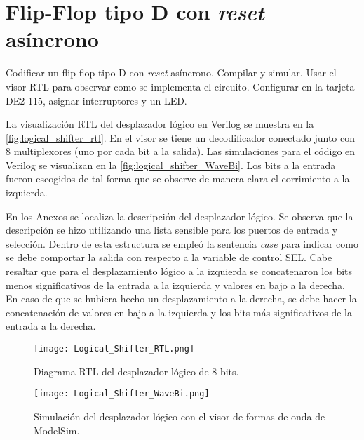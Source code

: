 \section{Flip-Flop tipo D con \textit{reset} asíncrono \label{sec:s1}}

\begin{center}
	\begin{minipage}{12cm}
		\begin{tcolorbox}[title=Actividad 1]
			Codificar un flip-flop tipo D con \textit{reset} asíncrono. Compilar y simular. Usar el visor RTL para observar como se implementa el circuito. Configurar en la tarjeta DE2-115, asignar interruptores y un LED.
		\end{tcolorbox}	
	\end{minipage}
\end{center}

La visualización RTL del desplazador lógico en Verilog se muestra en la \autoref{fig:logical_shifter_rtl}. En el visor se tiene un decodificador conectado junto con 8 multiplexores (uno por cada bit a la salida). Las simulaciones para el código en Verilog se visualizan en la \autoref{fig:logical_shifter_WaveBi}. Los bits a la entrada fueron escogidos de tal forma que se observe de manera clara el corrimiento a la izquierda.

En los Anexos se localiza la descripción del desplazador lógico. Se observa que la descripción se hizo utilizando una lista sensible para los puertos de entrada y selección. Dentro de esta estructura se empleó la sentencia \textit{case} para indicar como se debe comportar la salida con respecto a la variable de control SEL. Cabe resaltar que para el desplazamiento lógico a la izquierda se concatenaron los bits menos significativos de la entrada a la izquierda y valores en bajo a la derecha. En caso de que se hubiera hecho un desplazamiento a la derecha, se debe hacer la concatenación de valores en bajo a la izquierda y los bits más significativos de la entrada a la derecha.

\begin{figure}[ht]
	\centering
	\texttt{[image: Logical\_Shifter\_RTL.png]}
	\caption{Diagrama RTL del desplazador lógico de 8 bits. \label{fig:logical_shifter_rtl}}
\end{figure}

\begin{figure}[ht]
	\centering
	\texttt{[image: Logical\_Shifter\_WaveBi.png]}
	\caption{Simulación del desplazador lógico con el visor de formas de onda de ModelSim. \label{fig:logical_shifter_WaveBi}}
\end{figure}